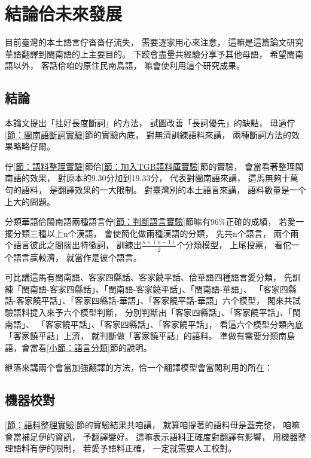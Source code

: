 \chapter{結論佮未來發展}
\label{章：結論佮未來發展}
目前臺灣的本土語言佇沓沓仔流失，
需要逐家用心來注意，
這嘛是這篇論文研究華語翻譯到閩南語的上主要目的。
下跤會盡量共經驗分享予其他母語，
希望閩南語以外，
客話佮咱的原住民南島語，
嘛會使利用這个研究成果。

\section{結論}
\label{節：結論}
本論文提出「拄好長度斷詞」的方法，
試圖改善「長詞優先」的缺點，
毋過佇\ref{節：閩南語斷詞實驗}節的實驗內底，
對無濟訓練語料來講，
兩種斷詞方法的效果略略仔爾。


佇\ref{節：語料整理實驗}節佮\ref{節：加入TGB語料庫實驗}節的實驗，
會當看著整理閩南語的效果，
對原本的9.30分加到19.33分，
代表對閩南語來講，
這馬無夠十萬句的語料，
是翻譯效果的一大限制。
對臺灣別的本土語言來講，
語料數量是一个上大的問題。

分類華語佮閩南語兩種語言佇\ref{節：判斷語言實驗}節嘛有$96\%$正確的成績，
若愛一擺分類三種以上n个漢語，
會使簡化做兩種漢語的分類，
先共n个語言，
兩个兩个語言彼此之間揣出特徵詞，
訓練出$\frac{n\times(n-1)}{2}$个分類模型，
上尾投票，
看佗一个語言贏較濟，
就當作是彼个語言。

可比講這馬有閩南語、客家四縣話、客家饒平話、佮華語四種語言愛分類，
先訓練「閩南語-客家四縣話」、「閩南語-客家饒平話」、「閩南語-華語」、
「客家四縣話-客家饒平話」、「客家四縣話-華語」、「客家饒平話-華語」六个模型，
閣來共試驗語料提入來予六个模型判斷，
分別判斷出「客家四縣話」、「客家饒平話」、「閩南語」、
「客家饒平話」、「客家四縣話」、「客家饒平話」，
看這六个模型分類內底「客家饒平話」上濟，
就判斷做「客家饒平話」的語料。
準做有需要分類南島語，會當看\ref{小節：語言分類}節的說明。

紲落來講兩个會當加強翻譯的方法，佮一个翻譯模型會當閣利用的所在：
\section{機器校對}
\label{節：鬥相共人工校對}

\ref{節：語料整理實驗}節的實驗結果共咱講，
就算咱提著的語料毋是蓋完整，
咱嘛會當補足伊的資訊，
予翻譯變好。
這嘛表示語料正確度對翻譯有影響，
用機器整理語料有伊的限制，
若愛予語料正確，
一定就需要人工校對。

